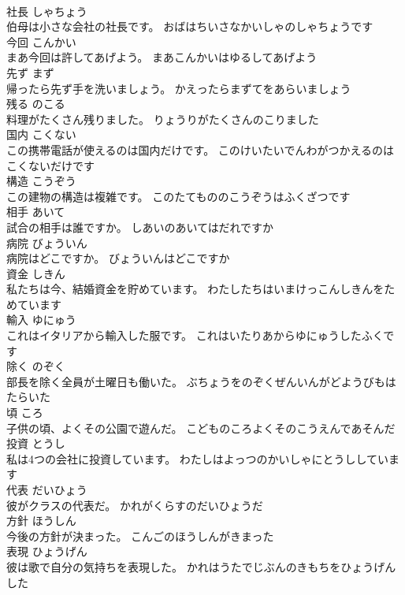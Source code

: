 \documentclass[8pt]{extreport}
\begin{document}
\begin{CJK}{UTF8}{min}
\\	社長	しゃちょう	
\\	伯母は小さな会社の社長です。	おばはちいさなかいしゃのしゃちょうです	
\\	今回	こんかい	
\\	まあ今回は許してあげよう。	まあこんかいはゆるしてあげよう	
\\	先ず	まず	
\\	帰ったら先ず手を洗いましょう。	かえったらまずてをあらいましょう	
\\	残る	のこる	
\\	料理がたくさん残りました。	りょうりがたくさんのこりました	
\\	国内	こくない	
\\	この携帯電話が使えるのは国内だけです。	このけいたいでんわがつかえるのはこくないだけです	
\\	構造	こうぞう	
\\	この建物の構造は複雑です。	このたてもののこうぞうはふくざつです	
\\	相手	あいて	
\\	試合の相手は誰ですか。	しあいのあいてはだれですか	
\\	病院	びょういん	
\\	病院はどこですか。	びょういんはどこですか	
\\	資金	しきん	
\\	私たちは今、結婚資金を貯めています。	わたしたちはいまけっこんしきんをためています	
\\	輸入	ゆにゅう	
\\	これはイタリアから輸入した服です。	これはいたりあからゆにゅうしたふくです	
\\	除く	のぞく	
\\	部長を除く全員が土曜日も働いた。	ぶちょうをのぞくぜんいんがどようびもはたらいた	
\\	頃	ころ	
\\	子供の頃、よくその公園で遊んだ。	こどものころよくそのこうえんであそんだ	
\\	投資	とうし	
\\	私は4つの会社に投資しています。	わたしはよっつのかいしゃにとうししています	
\\	代表	だいひょう	
\\	彼がクラスの代表だ。	かれがくらすのだいひょうだ	
\\	方針	ほうしん	
\\	今後の方針が決まった。	こんごのほうしんがきまった	
\\	表現	ひょうげん	
\\	彼は歌で自分の気持ちを表現した。	かれはうたでじぶんのきもちをひょうげんした	

\end{CJK}
\end{document}

